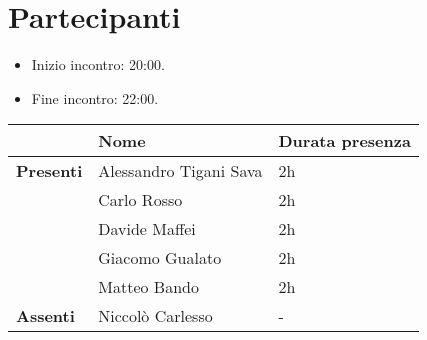 \section{Partecipanti}

\begin{itemize}
	\item Inizio incontro: 20:00.
	\item Fine incontro: 22:00.
\end{itemize}


\begin{center}
	{\renewcommand{\arraystretch}{1.5}
		\begin{tabular}{lll}
			                  & \textbf{Nome}          & \textbf{Durata presenza} \\
			\hline
			\textbf{Presenti} & Alessandro Tigani Sava & 2h                       \\
			                  & Carlo Rosso            & 2h                       \\
			                  & Davide Maffei          & 2h                       \\
			                  & Giacomo Gualato        & 2h                       \\
			                  & Matteo Bando           & 2h                       \\
			\textbf{Assenti}  & Niccolò Carlesso       & -                  \\
			\hline
		\end{tabular}
	}
\end{center}
